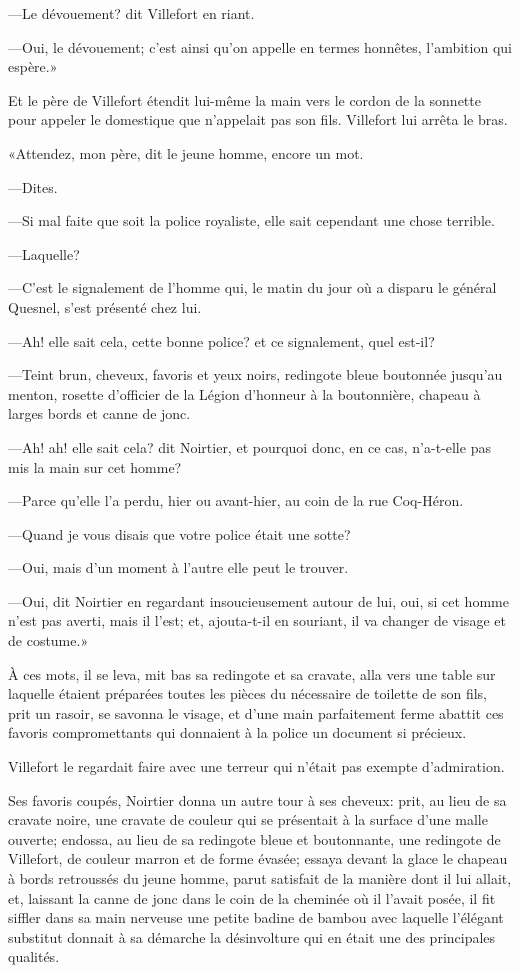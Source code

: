 —Le dévouement? dit Villefort en riant.

—Oui, le dévouement; c'est ainsi qu'on appelle en termes honnêtes, l'ambition qui espère.»

Et le père de Villefort étendit lui-même la main vers le cordon de la sonnette pour appeler le domestique que n'appelait pas son fils. Villefort lui arrêta le bras.

«Attendez, mon père, dit le jeune homme, encore un mot.

—Dites.

—Si mal faite que soit la police royaliste, elle sait cependant une chose terrible.

—Laquelle?

—C'est le signalement de l'homme qui, le matin du jour où a disparu le général Quesnel, s'est présenté chez lui.

—Ah! elle sait cela, cette bonne police? et ce signalement, quel est-il?

—Teint brun, cheveux, favoris et yeux noirs, redingote bleue boutonnée jusqu'au menton, rosette d'officier de la Légion d'honneur à la boutonnière, chapeau à larges bords et canne de jonc.

—Ah! ah! elle sait cela? dit Noirtier, et pourquoi donc, en ce cas, n'a-t-elle pas mis la main sur cet homme?

—Parce qu'elle l'a perdu, hier ou avant-hier, au coin de la rue Coq-Héron.

—Quand je vous disais que votre police était une sotte?

—Oui, mais d'un moment à l'autre elle peut le trouver.

—Oui, dit Noirtier en regardant insoucieusement autour de lui, oui, si cet homme n'est pas averti, mais il l'est; et, ajouta-t-il en souriant, il va changer de visage et de costume.»

À ces mots, il se leva, mit bas sa redingote et sa cravate, alla vers une table sur laquelle étaient préparées toutes les pièces du nécessaire de toilette de son fils, prit un rasoir, se savonna le visage, et d'une main parfaitement ferme abattit ces favoris compromettants qui donnaient à la police un document si précieux.

Villefort le regardait faire avec une terreur qui n'était pas exempte d'admiration.

Ses favoris coupés, Noirtier donna un autre tour à ses cheveux: prit, au lieu de sa cravate noire, une cravate de couleur qui se présentait à la surface d'une malle ouverte; endossa, au lieu de sa redingote bleue et boutonnante, une redingote de Villefort, de couleur marron et de forme évasée; essaya devant la glace le chapeau à bords retroussés du jeune homme, parut satisfait de la manière dont il lui allait, et, laissant la canne de jonc dans le coin de la cheminée où il l'avait posée, il fit siffler dans sa main nerveuse une petite badine de bambou avec laquelle l'élégant substitut donnait à sa démarche la désinvolture qui en était une des principales qualités.


